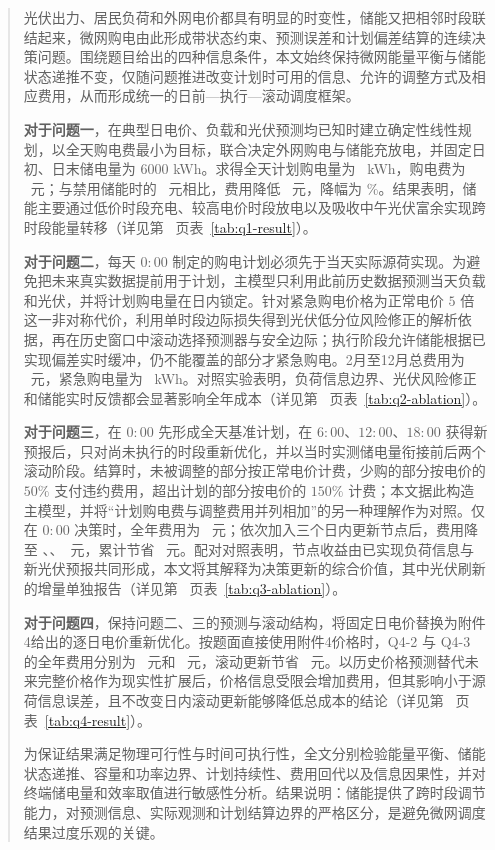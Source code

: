 \maketitle
\thispagestyle{plain}
\begin{abstract}

光伏出力、居民负荷和外网电价都具有明显的时变性，储能又把相邻时段联结起来，微网购电由此形成带状态约束、预测误差和计划偏差结算的连续决策问题。围绕题目给出的四种信息条件，本文始终保持微网能量平衡与储能状态递推不变，仅随问题推进改变计划时可用的信息、允许的调整方式及相应费用，从而形成统一的日前—执行—滚动调度框架。

\textbf{对于问题一}，在典型日电价、负载和光伏预测均已知时建立确定性线性规划，以全天购电费最小为目标，联合决定外网购电与储能充放电，并固定日初、日末储电量为 $6000$ kWh。求得全天计划购电量为 \QoneEnergy\ kWh，购电费为 \QoneCost\ 元；与禁用储能时的 \QoneNoStorage\ 元相比，费用降低 \QoneSave\ 元，降幅为 \QoneSavePct\%。结果表明，储能主要通过低价时段充电、较高电价时段放电以及吸收中午光伏富余实现跨时段能量转移（详见第~\pageref{tab:q1-result} 页表~\ref{tab:q1-result}）。

\textbf{对于问题二}，每天 $0{:}00$ 制定的购电计划必须先于当天实际源荷实现。为避免把未来真实数据提前用于计划，主模型只利用此前历史数据预测当天负载和光伏，并将计划购电量在日内锁定。针对紧急购电价格为正常电价 $5$ 倍这一非对称代价，利用单时段边际损失得到光伏低分位风险修正的解析依据，再在历史窗口中滚动选择预测器与安全边际；执行阶段允许储能根据已实现偏差实时缓冲，仍不能覆盖的部分才紧急购电。2月至12月总费用为 \QtwoTotal\ 元，紧急购电量为 \QtwoEmergency\ kWh。对照实验表明，负荷信息边界、光伏风险修正和储能实时反馈都会显著影响全年成本（详见第~\pageref{tab:q2-ablation} 页表~\ref{tab:q2-ablation}）。

\textbf{对于问题三}，在 $0{:}00$ 先形成全天基准计划，在 $6{:}00$、$12{:}00$、$18{:}00$ 获得新预报后，只对尚未执行的时段重新优化，并以当时实测储电量衔接前后两个滚动阶段。结算时，未被调整的部分按正常电价计费，少购的部分按电价的 $50\%$ 支付违约费用，超出计划的部分按电价的 $150\%$ 计费；本文据此构造主模型，并将“计划购电费与调整费用并列相加”的另一种理解作为对照。仅在 $0{:}00$ 决策时，全年费用为 \QthreeSzero\ 元；依次加入三个日内更新节点后，费用降至 \QthreeSone、\QthreeStwo、\QthreeSthree\ 元，累计节省 \QthreeVtotal\ 元。配对对照表明，节点收益由已实现负荷信息与新光伏预报共同形成，本文将其解释为决策更新的综合价值，其中光伏刷新的增量单独报告（详见第~\pageref{tab:q3-ablation} 页表~\ref{tab:q3-ablation}）。

\textbf{对于问题四}，保持问题二、三的预测与滚动结构，将固定日电价替换为附件4给出的逐日电价重新优化。按题面直接使用附件4价格时，Q4-2 与 Q4-3 的全年费用分别为 \QfourTwoMain\ 元和 \QfourThreeMain\ 元，滚动更新节省 \QfourRollPerfect\ 元。以历史价格预测替代未来完整价格作为现实性扩展后，价格信息受限会增加费用，但其影响小于源荷信息误差，且不改变日内滚动更新能够降低总成本的结论（详见第~\pageref{tab:q4-result} 页表~\ref{tab:q4-result}）。

为保证结果满足物理可行性与时间可执行性，全文分别检验能量平衡、储能状态递推、容量和功率边界、计划持续性、费用回代以及信息因果性，并对终端储电量和效率取值进行敏感性分析。结果说明：储能提供了跨时段调节能力，对预测信息、实际观测和计划结算边界的严格区分，是避免微网调度结果过度乐观的关键。

\end{abstract}
